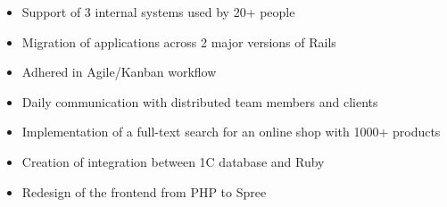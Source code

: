 \documentclass[12pt,a4paper,ragged2e]{altacv}
\renewcommand{\cvsection}[2][]{%
    \bigskip%
    \ifstrequal{#1}{}{}{\marginpar{\vspace*{\dimexpr1pt-\baselineskip}\raggedright}}%
    {\color{heading}\bfseries\MakeUppercase{#2}}\\[-1ex]%
    {\color{heading}\rule{\linewidth}{2pt}\par}\medskip
  }
\begin{document}
\divider

\begin{itemize}
\item Support of 3 internal systems used by 20+ people
\item Migration of applications across 2 major versions of Rails
\item Adhered in Agile/Kanban workflow
\item Daily communication with distributed team members and clients
\end{itemize}

\divider

\begin{itemize}
\item Implementation of a full-text search for an online shop with 1000+ products
\item Creation of integration between 1C database and Ruby
\item Redesign of the frontend from PHP to Spree

\end{itemize}

\medskip



\begin{comment}
\clearpage
\cvsection[page2sidebar]{Publications}

\nocite{*}

\printbibliography[heading=pubtype,title={\printinfo{\faBook}{Books}},type=book]

\divider

\printbibliography[heading=pubtype,title={\printinfo{\faFileTextO}{Journal Articles}},type=article]

\divider

\printbibliography[heading=pubtype,title={\printinfo{\faGroup}{Conference Proceedings}},type=inproceedings]


\end{comment}
\end{document}
